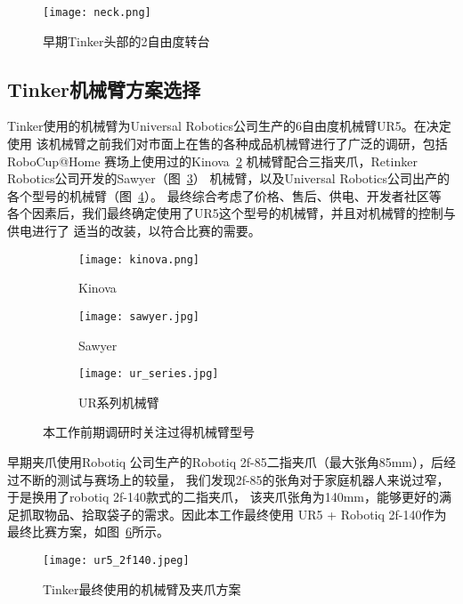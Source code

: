 \begin{figure}[ht] %
  \centering
  \texttt{[image: neck.png]}
  \caption{早期Tinker头部的2自由度转台}
  \label{fig:neck}
\end{figure}

\subsection{Tinker机械臂方案选择}

Tinker使用的机械臂为Universal Robotics公司生产的6自由度机械臂UR5。在决定使用
该机械臂之前我们对市面上在售的各种成品机械臂进行了广泛的调研，包括RoboCup@Home
赛场上使用过的Kinova~\ref{fig:kinova}
机械臂配合三指夹爪，Retinker Robotics公司开发的Sawyer（图~\ref{fig:sawyer}）
机械臂，以及Universal Robotics公司出产的各个型号的机械臂（图~\ref{fig:ur_series}）。
最终综合考虑了价格、售后、供电、开发者社区等
各个因素后，我们最终确定使用了UR5这个型号的机械臂，并且对机械臂的控制与供电进行了
适当的改装，以符合比赛的需要。

\begin{figure}
\centering
\begin{subfigure}{.5\textwidth}
  \centering
  \texttt{[image: kinova.png]}
  \caption{Kinova}
  \label{fig:kinova}
\end{subfigure}%
\begin{subfigure}{.5\textwidth}
  \centering
  \texttt{[image: sawyer.jpg]}
  \caption{Sawyer}
  \label{fig:sawyer}
\end{subfigure}
\begin{subfigure}{.8\textwidth}
  \centering
  \texttt{[image: ur\_series.jpg]}
  \caption{UR系列机械臂}
  \label{fig:ur_series}
\end{subfigure}
\caption{本工作前期调研时关注过得机械臂型号}
\label{fig:arms}
\end{figure}

早期夹爪使用Robotiq
公司生产的Robotiq 2f-85二指夹爪（最大张角85mm），后经过不断的测试与赛场上的较量，
我们发现2f-85的张角对于家庭机器人来说过窄，于是换用了robotiq 2f-140款式的二指夹爪，
该夹爪张角为140mm，能够更好的满足抓取物品、拾取袋子的需求。因此本工作最终使用
UR5 + Robotiq 2f-140作为最终比赛方案，如图~\ref{fig:ur5_2f140}所示。

\begin{figure}[ht] %
  \centering
  \texttt{[image: ur5\_2f140.jpeg]}
  \caption{Tinker最终使用的机械臂及夹爪方案}
  \label{fig:ur5_2f140}
\end{figure}

